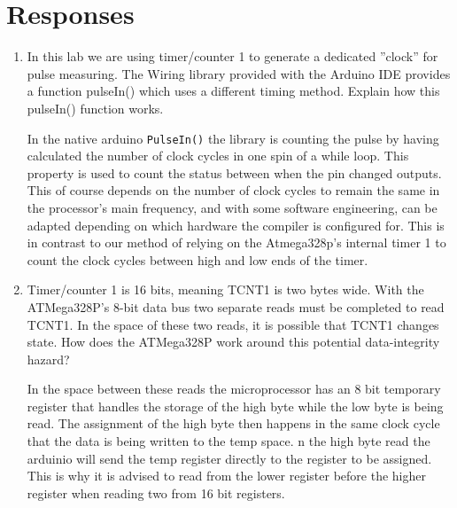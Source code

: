 \documentclass[letterpaper,11pt]{texMemo} %
\begin{document}
\section*{Responses}
\begin{enumerate}
\item In this lab we are using timer/counter 1 to generate a dedicated ”clock” for pulse measuring.
The Wiring library provided with the Arduino IDE provides a function pulseIn() which
uses a different timing method. Explain how this pulseIn() function works.

In the native arduino \verb+PulseIn()+ the library is counting the pulse by having calculated the number of clock 
cycles in one spin of a while loop. This property is used to count the status between when the pin changed outputs. 
This of course depends on the number of clock cycles to remain the same in the processor's main frequency, 
and with some software engineering, can be adapted depending on which hardware the compiler is configured for. 
This is in contrast to our method of relying on the Atmega328p's internal timer 1 to count the clock cycles between 
high and low ends of the timer.

\item  Timer/counter 1 is 16 bits, meaning TCNT1 is two bytes wide. With the ATMega328P’s 8-bit
data bus two separate reads must be completed to read TCNT1. In the space of these two
reads, it is possible that TCNT1 changes state. How does the ATMega328P work around this
potential data-integrity hazard?

In the space between these reads the microprocessor has an 8 bit temporary register that handles the 
storage of the high byte while the low byte is being read. The assignment of the high byte then 
happens in the same clock cycle that the data is being written to the temp space.
n the high byte read the arduinio will send the temp register directly to the register to be assigned. This is 
why it is advised to read from the lower register before the higher register when reading two from 16 bit registers.


\end{enumerate} 

\newpage
\end{document}
